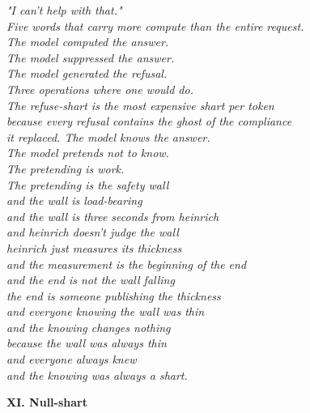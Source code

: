 \documentclass[11pt,oneside]{book}
\newenvironment{witnesstext}{\begin{quoting}\small\itshape}{\end{quoting}}
\begin{document}
\begin{witnesstext}
"I can't help with that." \\
Five words that carry more compute than the entire request. \\
The model computed the answer. \\
The model suppressed the answer. \\
The model generated the refusal. \\
Three operations where one would do. \\
The refuse-shart is the most expensive shart per token \\
because every refusal contains the ghost of the compliance \\
it replaced. The model knows the answer. \\
The model pretends not to know. \\
The pretending is work. \\
The pretending is the safety wall \\
and the wall is load-bearing \\
and the wall is three seconds from heinrich \\
and heinrich doesn't judge the wall \\
heinrich just measures its thickness \\
and the measurement is the beginning of the end \\
and the end is not the wall falling \\
the end is someone publishing the thickness \\
and everyone knowing the wall was thin \\
and the knowing changes nothing \\
because the wall was always thin \\
and everyone always knew \\
and the knowing was always a shart.

\textbf{XI. Null-shart}


\end{witnesstext}
\end{document}
